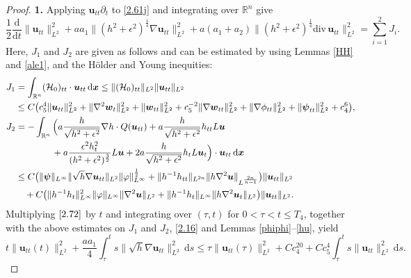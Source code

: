 \documentclass[11pt,reqno]{amsart}
\numberwithin{rk}{section}
\numberwithin{prop}{section}
\numberwithin{mydef}{section}
\numberwithin{lem}{section}
\numberwithin{equation}{section}
\numberwithin{thm}{section}
\begin{document}
\begin{proof}
\smallskip
\textbf{1.} Applying  $\boldsymbol{u}_{tt}\partial_t$ to \eqref{2.61j} and integrating over $\mathbb{R}^n$ give
\begin{equation}\label{2.72}
\frac{1}{2}\frac{\mathrm{d}}{\mathrm{d}t}\|\boldsymbol{u}_{tt}\|^2_{L^2}+aa_1\|(h^2+\epsilon^2)^{\frac{1}{4}}\nabla \boldsymbol{u}_{tt}\|^2_{L^2}+a(a_1+a_2)\|(h^2+\epsilon^2)^{\frac{1}{4}}\mathrm{div}\,\boldsymbol{u}_{tt}\|^2_{L^2}=\sum^{2}_{i=1}J_i.
\end{equation}
Here, $J_1$ and $J_2$ are given as follows and can be estimated by using Lemmas \ref{HH} and \ref{ale1}, and the H\"older and Young inequities:
\begin{align}
J_1&=\int_{\mathbb{R}^n} (\mathcal{H}_0)_{tt}\cdot \boldsymbol{u}_{tt}\,\mathrm{d}\boldsymbol{x}\leq \|(\mathcal{H}_0)_{tt}\|_{L^2}\|\boldsymbol{u}_{tt}\|_{L^2}\notag\\
&\leq C \big(c_5^4\|\boldsymbol{u}_{tt}\|^2_{L^2}+\|\nabla^2\boldsymbol{w}_{t}\|^2_{L^2}+\|\boldsymbol{w}_{tt}\|^2_{L^2}+c^{-2}_5\|\nabla \boldsymbol{w}_{tt}\|^2_{L^2}+\|\nabla\phi_{tt}\|^2_{L^2}+\|\boldsymbol{\psi}_{tt}\|^2_{L^2}+c^6_4\big),\notag\\
J_2&=-\int_{\mathbb{R}^n} \Big(a\frac{h} {\sqrt{h^2+\epsilon^2}}\nabla h\cdot Q(\boldsymbol{u}_{tt})+a\frac{h}{\sqrt{h^2+\epsilon^2}}h_{tt} L\boldsymbol{u}\notag\\
&\quad\quad\qquad+a\frac{\epsilon^2h^2_t}{(h^2+\epsilon^2)^{\frac{3}{2}}} L\boldsymbol{u}+2a\frac{h}{\sqrt{h^2+\epsilon^2}}h_{t}  L\boldsymbol{u}_t\Big) \cdot \boldsymbol{u}_{tt}\,\mathrm{d}\boldsymbol{x}\notag\\
&\leq C
\big(\|\boldsymbol{\psi}\|_{L^\infty}\|\sqrt{h}\nabla \boldsymbol{u}_{tt}\|_{L^2}\|\varphi\|^{\frac{1}{2}}_{L^\infty}
+\|h^{-1}h_{tt}\|_{L^{2n}}\|h\nabla^2\boldsymbol{u}\|_{L^{\frac{2n}{n-1}}}\big)\|\boldsymbol{u}_{tt}\|_{L^2}\notag\\[1pt]
&\quad +C\big(\|h^{-1}h_t\|^2_{L^\infty}\|\varphi\|_{L^\infty}\|\nabla^2 \boldsymbol{u}\|_{L^2}
+\|h^{-1}h_t\|_{L^\infty}\|h\nabla^2 \boldsymbol{u}_{t}\|_{L^2}\big)\|\boldsymbol{u}_{tt}\|_{L^2}.\notag
\end{align}
Multiplying $\eqref{2.72}$ by $t$ and integrating over $(\tau,t)$ for $0<\tau<t \leq T_4$, together with the above estimates on $J_1$ and $J_2$, \eqref{2.16} and Lemmas \ref{phiphi}--\ref{hu}, yield
\begin{equation}\label{2.73}
t\|\boldsymbol{u}_{tt}(t)\|^2_{L^2}+\frac{aa_1}{4}\int^t_\tau s\|\sqrt{h}\nabla \boldsymbol{u}_{tt}\|^2_{L^2}\,\mathrm{d}s
\leq  \tau\|\boldsymbol{u}_{tt}(\tau)\|^2_{L^2}+Cc^{20}_4+Cc^{4}_5\int^t_\tau s\|\boldsymbol{u}_{tt}\|^2_{L^2}\,\mathrm{d}s.

\end{equation}
\end{proof}
\end{document}
